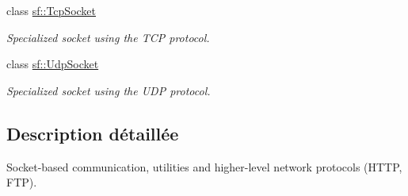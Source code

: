 \begin{DoxyCompactItemize}
class \hyperlink{classsf_1_1TcpSocket}{sf\+::\+Tcp\+Socket}
\begin{DoxyCompactList}\small\item\em Specialized socket using the T\+CP protocol. \end{DoxyCompactList}\item 
class \hyperlink{classsf_1_1UdpSocket}{sf\+::\+Udp\+Socket}
\begin{DoxyCompactList}\small\item\em Specialized socket using the U\+DP protocol. \end{DoxyCompactList}\end{DoxyCompactItemize}


\subsection{Description détaillée}
Socket-\/based communication, utilities and higher-\/level network protocols (H\+T\+TP, F\+TP). 